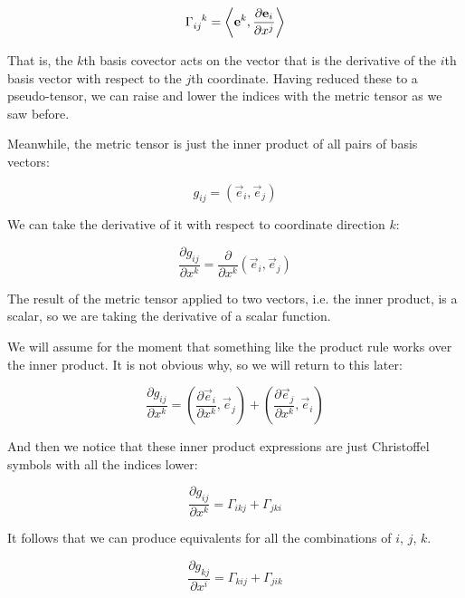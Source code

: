 \begin{equation}
    \Gamma\indices{_i_j^k}
=
\biggl<
\vec{e}^k,
\frac{\partial \vec{e}_i}{\partial x^j}
\biggr>
\end{equation}

That is, the $k$th basis covector acts on the vector that is the derivative of the $i$th basis vector with respect to the $j$th coordinate. Having reduced these to a pseudo-tensor, we can raise and lower the indices with the metric tensor as we saw before.

Meanwhile, the metric tensor is just the inner product of all pairs of basis vectors:

\begin{equation}
g_{ij} = \left( \vec{e}_i,\vec{e}_j \right)
\end{equation}

We can take the derivative of it with respect to coordinate direction $k$:

\begin{equation}
\frac{\partial g_{ij}}{\partial x^k} 
=
\frac{\partial}{\partial x^k}
\left(
\vec{e}_i,\vec{e}_j
 \right)
\end{equation}

The result of the metric tensor applied to two vectors, i.e. the inner product, is a scalar, so we are taking the derivative of a scalar function.

We will assume for the moment that something like the product rule works over the inner product. It is not obvious why, so we will return to this later:

\begin{equation}
\frac{\partial g_{ij}}{\partial x^k} 
=
\left(
\frac{\partial \vec{e}_i}{\partial x^k}
,\vec{e}_j
 \right)
+
\left(
\frac{\partial \vec{e}_j}{\partial x^k}
,\vec{e}_i
 \right)
\end{equation}

And then we notice that these inner product expressions are just Christoffel symbols with all the indices lower:

\begin{equation}
\frac{\partial g_{ij}}{\partial x^k} 
=
\Gamma_{ikj}+\Gamma_{jki}
\end{equation}

It follows that we can produce equivalents for all the combinations of $i$, $j$, $k$.

\begin{equation}
\frac{\partial g_{kj}}{\partial x^i} 
=
\Gamma_{kij}+\Gamma_{jik}
\end{equation}

